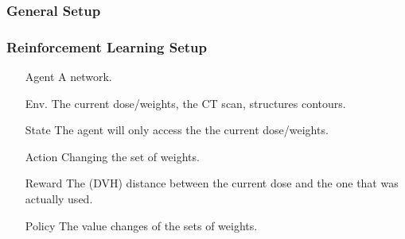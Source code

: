 \documentclass{beamer}
\begin{document}
	\subsubsection{General Setup}
	\begin{frame}
		\frametitle{Reinforcement Learning Setup}
		\begin{itemize}
			\item [Agent] A network.
			\item [Env.] The current dose/weights, the CT scan, structures contours.
			\item [State] The agent will only access the the current dose/weights.
			\item [Action] Changing the set of weights.
			\item [Reward] The (DVH) distance between the current dose and the one that was actually used.
			\item [Policy] The value changes of the sets of weights.
		\end{itemize}
	\end{frame}
\end{document}
